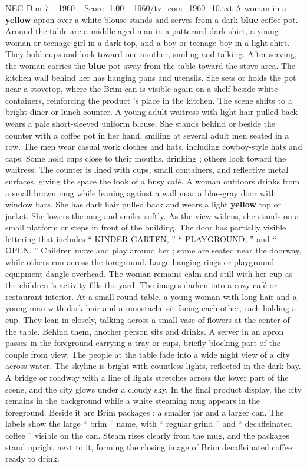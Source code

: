 \begin{textsample}{NEG Dim 7 – 1960 – Score -1.00 – 1960/tv\_com\_1960\_10.txt}
A woman in a \textbf{yellow} apron over a white blouse stands and serves from a dark \textbf{blue} coffee pot.
Around the table are a middle-aged man in a patterned dark shirt, a young woman or teenage girl in a dark top, and a boy or teenage boy in a light shirt.
They hold cups and look toward one another, smiling and talking.
After serving, the woman carries the \textbf{blue} pot away from the table toward the stove area.
The kitchen wall behind her has hanging pans and utensils.
She sets or holds the pot near a stovetop, where the Brim can is visible again on a shelf beside white containers, reinforcing the product ’s place in the kitchen.
The scene shifts to a bright diner or lunch counter.
A young adult waitress with light hair pulled back wears a pale short-sleeved uniform blouse.
She stands behind or beside the counter with a coffee pot in her hand, smiling at several adult men seated in a row.
The men wear casual work clothes and hats, including cowboy-style hats and caps.
Some hold cups close to their mouths, drinking ; others look toward the waitress.
The counter is lined with cups, small containers, and reflective metal surfaces, giving the space the look of a busy café.
A woman outdoors drinks from a small brown mug while leaning against a wall near a blue-gray door with window bars.
She has dark hair pulled back and wears a light \textbf{yellow} top or jacket.
She lowers the mug and smiles softly.
As the view widens, she stands on a small platform or steps in front of the building.
The door has partially visible lettering that includes “ KINDER GARTEN, ” “ PLAYGROUND, ” and “ OPEN. ” Children move and play around her ; some are seated near the doorway, while others run across the foreground.
Large hanging rings or playground equipment dangle overhead.
The woman remains calm and still with her cup as the children ’s activity fills the yard.
The images darken into a cozy café or restaurant interior.
At a small round table, a young woman with long hair and a young man with dark hair and a moustache sit facing each other, each holding a cup.
They lean in closely, talking across a small vase of flowers at the center of the table.
Behind them, another person sits and drinks.
A server in an apron passes in the foreground carrying a tray or cups, briefly blocking part of the couple from view.
The people at the table fade into a wide night view of a city across water.
The skyline is bright with countless lights, reflected in the dark bay.
A bridge or roadway with a line of lights stretches across the lower part of the scene, and the city glows under a cloudy sky.
In the final product display, the city remains in the background while a white steaming mug appears in the foreground.
Beside it are Brim packages : a smaller jar and a larger can.
The labels show the large “ brim ” name, with “ regular grind ” and “ decaffeinated coffee ” visible on the can.
Steam rises clearly from the mug, and the packages stand upright next to it, forming the closing image of Brim decaffeinated coffee ready to drink.

\end{textsample}
